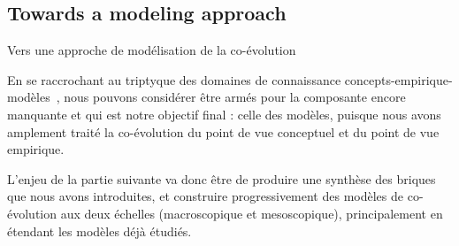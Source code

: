 \subsection*{Towards a modeling approach}{Vers une approche de modélisation de la co-évolution}


En se raccrochant au triptyque des domaines de connaissance concepts-empirique-modèles~\cite{livet2010}, nous pouvons considérer être armés pour la composante encore manquante et qui est notre objectif final : celle des modèles, puisque nous avons amplement traité la co-évolution du point de vue conceptuel et du point de vue empirique. 


L'enjeu de la partie suivante va donc être de produire une synthèse des briques que nous avons introduites, et construire progressivement des modèles de co-évolution aux deux échelles (macroscopique et mesoscopique), principalement en étendant les modèles déjà étudiés.












